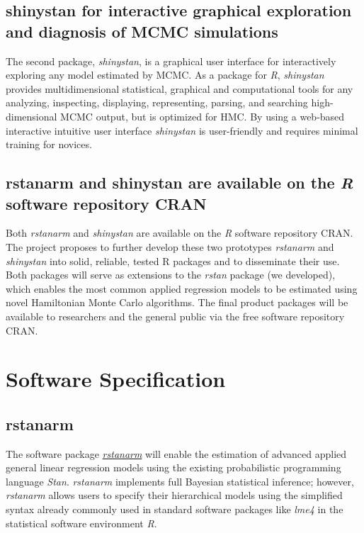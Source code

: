 \documentclass[11pt,notitlepage]{article}
\begin{document}
\subsection*{shinystan for interactive graphical exploration and diagnosis of MCMC simulations}  
The second package, \textit{shinystan}, is a graphical user interface for interactively exploring any model estimated by MCMC. As a 
package for \textit{R}, \textit{shinystan}  provides multidimensional statistical, graphical and computational tools for any analyzing,
inspecting, displaying, representing, parsing, and searching high-dimensional MCMC output, but is optimized for HMC. By using a web-based 
interactive intuitive user interface \textit{shinystan} is user-friendly and requires minimal training for novices.

\subsection*{rstanarm and shinystan are available on the \textit{R} software repository CRAN}
Both \textit{rstanarm} \cite{rstanarm} and \textit{shinystan} \cite{shinystan, Team2015} are available on the \textit{R} software 
repository CRAN. The project proposes to further develop these two prototypes \textit{rstanarm} and \textit{shinystan} into solid, 
reliable, tested R packages and to disseminate their use. Both packages will serve as extensions to the \textit{rstan} package 
(we developed), which enables the most common applied regression models to be estimated using novel Hamiltonian Monte Carlo algorithms. 
The final product packages will be available to researchers and the general public via the free software repository CRAN. 

\section*{Software Specification}

\subsection*{rstanarm}
The software package \href{https://github.com/stan-dev/rstanarm}{\textit{rstanarm}}
will enable the estimation of advanced applied general linear regression models using 
the existing probabilistic programming language \textit{Stan}. 
\textit{rstanarm} implements full Bayesian statistical inference;  
however, \textit{rstanarm} allows users to specify their 
hierarchical models using the simplified syntax already commonly 
used in standard software packages like \textit{lme4} in the statistical 
software environment \textit{R}. 
\end{document}
